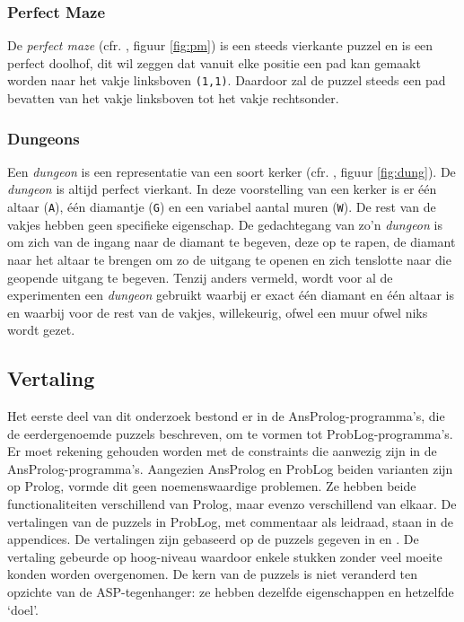 \documentclass{article}
\begin{document}
	\subsubsection*{Perfect Maze}
	De \textit{perfect maze} (cfr. \cite{togelius2015chapter8}, figuur \ref{fig:pm}) is een steeds vierkante puzzel en is een perfect doolhof, dit wil zeggen dat vanuit elke positie een pad kan gemaakt worden naar het vakje linksboven \texttt{(1,1)}. Daardoor zal de puzzel steeds een pad bevatten van het vakje linksboven tot het vakje rechtsonder.
	
		\subsubsection*{Dungeons}
	Een \textit{dungeon} is een representatie van een soort kerker (cfr. \cite{togelius2015chapter8}, figuur \ref{fig:dung}). De \textit{dungeon} is altijd perfect vierkant. In deze voorstelling van een kerker is er \'e\'en altaar (\texttt{A}), \'e\'en diamantje (\texttt{G}) en een variabel aantal muren (\texttt{W}). De rest van de vakjes hebben geen specifieke eigenschap. De gedachtegang van zo'n \textit{dungeon} is om zich van de ingang naar de diamant te begeven, deze op te rapen, de diamant naar het altaar te brengen om zo de uitgang te openen en zich tenslotte naar die geopende uitgang te begeven. Tenzij anders vermeld, wordt voor al de experimenten een \textit{dungeon} gebruikt waarbij er exact \'e\'en diamant en \'e\'en altaar is en waarbij voor de rest van de vakjes, willekeurig, ofwel een muur ofwel niks wordt gezet.
			
	\subsection{Vertaling}
	Het eerste deel van dit onderzoek bestond er in de AnsProlog-programma's, die de eerdergenoemde puzzels beschreven, om te vormen tot ProbLog-programma's. Er moet rekening gehouden worden met de constraints die aanwezig zijn in de AnsProlog-programma's. Aangezien AnsProlog en ProbLog beiden varianten zijn op Prolog, vormde dit geen noemenswaardige problemen. Ze hebben beide functionaliteiten verschillend van Prolog, maar evenzo verschillend van elkaar. De vertalingen van de puzzels in ProbLog, met commentaar als leidraad, staan in de appendices. De vertalingen zijn gebaseerd op de puzzels gegeven in \cite{journals/tciaig/SmithM11} en \cite{togelius2015chapter8}. De vertaling gebeurde op hoog-niveau waardoor enkele stukken zonder veel moeite konden worden overgenomen. De kern van de puzzels is niet veranderd ten opzichte van de ASP-tegenhanger: ze hebben dezelfde eigenschappen en hetzelfde `doel'.
	
\end{document}
